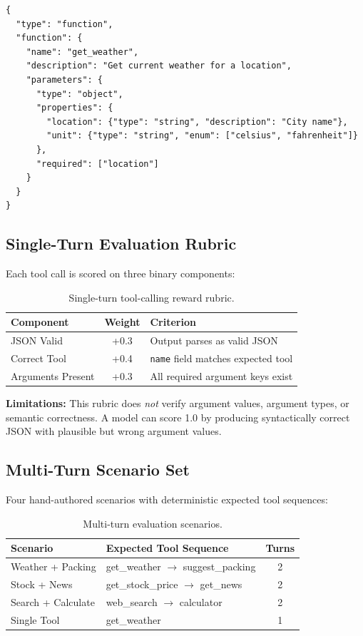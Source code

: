 \documentclass{article}
\begin{document}
\begin{verbatim}
{
  "type": "function",
  "function": {
    "name": "get_weather",
    "description": "Get current weather for a location",
    "parameters": {
      "type": "object",
      "properties": {
        "location": {"type": "string", "description": "City name"},
        "unit": {"type": "string", "enum": ["celsius", "fahrenheit"]}
      },
      "required": ["location"]
    }
  }
}
\end{verbatim}

\subsection{Single-Turn Evaluation Rubric}

Each tool call is scored on three binary components:

\begin{table}[htbp]
    \centering
    \caption{Single-turn tool-calling reward rubric.}
    \begin{tabular}{lcp{6cm}}
        \toprule
        Component & Weight & Criterion \\
        \midrule
        JSON Valid & +0.3 & Output parses as valid JSON \\
        Correct Tool & +0.4 & \texttt{name} field matches expected tool \\
        Arguments Present & +0.3 & All required argument keys exist \\
        \bottomrule
    \end{tabular}
\end{table}

\textbf{Limitations:} This rubric does \emph{not} verify argument values, argument types, or semantic correctness. A model can score 1.0 by producing syntactically correct JSON with plausible but wrong argument values.

\subsection{Multi-Turn Scenario Set}

Four hand-authored scenarios with deterministic expected tool sequences:

\begin{table}[htbp]
    \centering
    \caption{Multi-turn evaluation scenarios.}
    \begin{tabular}{llc}
        \toprule
        Scenario & Expected Tool Sequence & Turns \\
        \midrule
        Weather + Packing & get\_weather $\rightarrow$ suggest\_packing & 2 \\
        Stock + News & get\_stock\_price $\rightarrow$ get\_news & 2 \\
        Search + Calculate & web\_search $\rightarrow$ calculator & 2 \\
        Single Tool & get\_weather & 1 \\
        \bottomrule
    \end{tabular}
\end{table}
\end{document}
